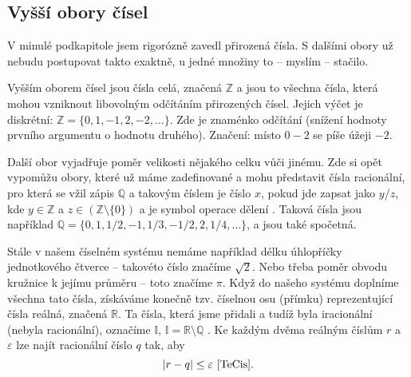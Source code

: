 \subsection{Vyšší obory čísel}
\label{kap:vyssi_obory_cisel}
V minulé podkapitole jsem rigorózně zavedl přirozená čísla. S dalšími obory už nebudu postupovat takto exaktně, u jedné množiny to -- myslím -- stačilo.

Vyšším oborem čísel jsou čísla celá, značená $\mathbb{Z}$ a jsou to všechna čísla, která mohou vzniknout libovolným odčítáním přirozených čísel. Jejich výčet je diskrétní: $\mathbb{Z} = \{0, 1, -1, 2, -2, \ldots\}$\cite{OEIS:integer}. Zde \uv{$-$} je znaménko odčítání (snížení hodnoty prvního argumentu o hodnotu druhého). Značení: místo $0-2$ se píše úžeji $-2$.

Další obor vyjadřuje poměr velikosti nějakého celku vůči jinému. Zde si opět vypomůžu obory, které už máme zadefinované a mohu představit čísla racionální, pro která se vžil zápis $\mathbb{Q}$ a takovým číslem je číslo $x$, pokud jde zapsat jako $y$/$z$, kde $y \in \mathbb{Z}$ a $z \in \left( \mathbb{Z} \setminus \{0\} \right)$ a \uv{$/$} je symbol operace dělení \cite{SPIVAK:calculus}. Taková čísla jsou například $\mathbb{Q} = \{0, 1, 1/2, -1, 1/3, -1/2, 2, 1/4, \ldots \}$, a jsou také spočetná.

Stále v našem číselném systému nemáme například délku úhlopříčky jednotkového čtverce -- takovéto číslo značíme $\sqrt{2}$. Nebo třeba poměr obvodu kružnice k jejímu průměru -- toto značíme $\pi$. Když do našeho systému doplníme všechna tato čísla, získáváme konečně tzv. číselnou osu (přímku) reprezentující čísla reálná, značená $\mathbb{R}$. Ta čísla, která jsme přidali a tudíž byla iracionální (nebyla racionální), označíme $\mathbb{I}$, $\mathbb{I} = \mathbb{R} \setminus \mathbb{Q}$ \cite{tabulky}. Ke každým dvěma reálným číslům $r$ a $\varepsilon$ lze najít racionální číslo $q$ tak, aby
\begin{equation}\label{rov:rac_u_real}
|r-q|\leq\varepsilon \text{~\cite{TeCis}}.
\end{equation}

